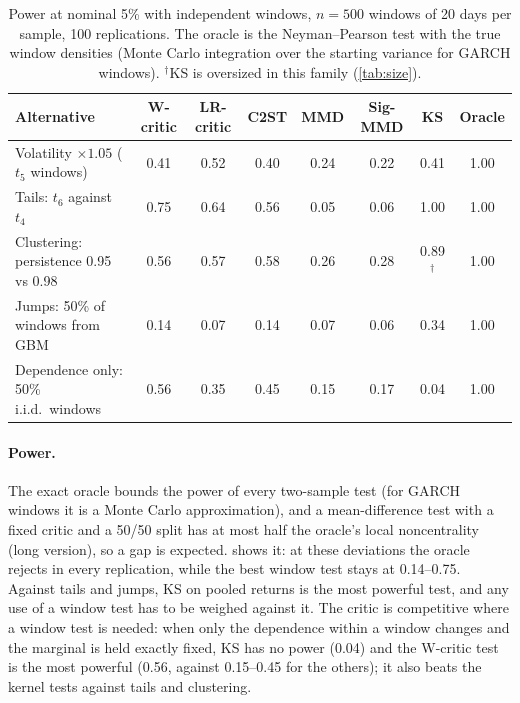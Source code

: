 \documentclass[11pt,a4paper]{article}
\theoremstyle{plain}
\newcommand{\WC}{W-critic}
\begin{document}
\begin{table}[t]
\centering
\caption{Power at nominal 5\% with independent windows, $n=500$ windows of 20 days per sample, 100
  replications. The oracle is the Neyman--Pearson test with the true window densities (Monte Carlo
  integration over the starting variance for GARCH windows). $^\dagger$KS is oversized in this
  family (\cref{tab:size}).}
\label{tab:power}
\small
\setlength{\tabcolsep}{5pt}
\begin{tabular}{@{}lccccccc@{}}
\toprule
Alternative & \WC{} & LR-critic & C2ST & MMD & Sig-MMD & KS & Oracle \\
\midrule
Volatility $\times1.05$ ($t_5$ windows) & 0.41 & 0.52 & 0.40 & 0.24 & 0.22 & 0.41 & 1.00 \\
Tails: $t_6$ against $t_4$ & 0.75 & 0.64 & 0.56 & 0.05 & 0.06 & 1.00 & 1.00 \\
Clustering: persistence 0.95 vs 0.98 & 0.56 & 0.57 & 0.58 & 0.26 & 0.28 & 0.89$^\dagger$ & 1.00 \\
Jumps: 50\% of windows from GBM & 0.14 & 0.07 & 0.14 & 0.07 & 0.06 & 0.34 & 1.00 \\
Dependence only: 50\% i.i.d.\ windows & 0.56 & 0.35 & 0.45 & 0.15 & 0.17 & 0.04 & 1.00 \\
\bottomrule
\end{tabular}
\end{table}

\paragraph{Power.} The exact oracle bounds the power of every two-sample test (for GARCH windows it
is a Monte Carlo approximation), and a mean-difference test with a fixed critic and a 50/50 split
has at most half the oracle's local noncentrality (long version), so a gap is expected.
 shows it: at these deviations the oracle rejects in every replication, while the
best window test stays at 0.14--0.75. Against tails and jumps, KS on pooled returns is the most
powerful test, and any use of a window test has to be weighed against it. The critic is competitive
where a window test is needed: when only the dependence within a window changes and the marginal is
held exactly fixed, KS has no power (0.04) and the \WC{} test is the most powerful (0.56, against
0.15--0.45 for the others); it also beats the kernel tests against tails and clustering.
\end{document}
